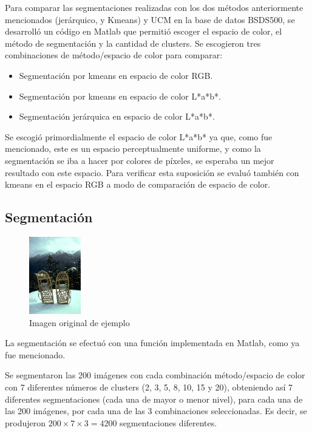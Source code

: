 \documentclass[10pt,twocolumn,letterpaper]{article}
\begin{document}
Para comparar las segmentaciones realizadas con los dos métodos anteriormente mencionados (jerárquico, y Kmeans) y UCM en la base de datos BSDS500, se desarrolló un código en Matlab que permitió escoger el espacio de color, el método de segmentación y la cantidad de clusters. Se escogieron tres combinaciones de método/espacio de color para comparar:

\begin{itemize}
	\item Segmentación por kmeans en espacio de color RGB.
    \item Segmentación por kmeans en espacio de color L*a*b*.
    \item Segmentación jerárquica en espacio de color L*a*b*.
\end{itemize}

Se escogió primordialmente el espacio de color L*a*b* ya que, como fue mencionado, este es un espacio perceptualmente uniforme, y como la segmentación se iba a hacer por colores de píxeles, se esperaba un mejor resultado con este espacio. Para verificar esta suposición se evaluó también con kmeans en el espacio RGB a modo de comparación de espacio de color.

\subsection{Segmentación}

\begin{figure}[h]
    \centering
    \includegraphics[width=0.2\textwidth]{Original.jpg}
    \caption{Imagen original de ejemplo}
    \label{fig:original}
\end{figure}

La segmentación se efectuó con una función implementada en Matlab, como ya fue mencionado. 

Se segmentaron las 200 imágenes con cada combinación método/espacio de color con 7 diferentes números de clusters (2, 3, 5, 8, 10, 15 y 20), obteniendo así 7 diferentes segmentaciones (cada una de mayor o menor nivel), para cada una de las 200 imágenes, por cada una de las 3 combinaciones seleccionadas. Es decir, se produjeron \(200 \times 7 \times 3 = 4200\) segmentaciones diferentes.
\end{document}
